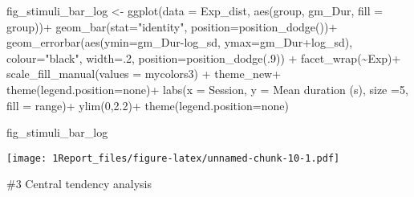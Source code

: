 \documentclass[
]{article}
\newenvironment{Shaded}{\begin{snugshade}}{\end{snugshade}}
\newcommand{\AttributeTok}[1]{\textcolor[rgb]{0.77,0.63,0.00}{#1}}
\newcommand{\DecValTok}[1]{\textcolor[rgb]{0.00,0.00,0.81}{#1}}
\newcommand{\FloatTok}[1]{\textcolor[rgb]{0.00,0.00,0.81}{#1}}
\newcommand{\FunctionTok}[1]{\textcolor[rgb]{0.00,0.00,0.00}{#1}}
\newcommand{\NormalTok}[1]{#1}
\newcommand{\OtherTok}[1]{\textcolor[rgb]{0.56,0.35,0.01}{#1}}
\newcommand{\SpecialCharTok}[1]{\textcolor[rgb]{0.00,0.00,0.00}{#1}}
\newcommand{\StringTok}[1]{\textcolor[rgb]{0.31,0.60,0.02}{#1}}
\begin{document}
\begin{Shaded}
\begin{Highlighting}[]
\NormalTok{fig\_stimuli\_bar\_log }\OtherTok{\textless{}{-}} \FunctionTok{ggplot}\NormalTok{(}\AttributeTok{data =}\NormalTok{ Exp\_dist, }\FunctionTok{aes}\NormalTok{(group, gm\_Dur, }\AttributeTok{fill =}\NormalTok{ group))}\SpecialCharTok{+}
  \FunctionTok{geom\_bar}\NormalTok{(}\AttributeTok{stat=}\StringTok{"identity"}\NormalTok{, }\AttributeTok{position=}\FunctionTok{position\_dodge}\NormalTok{())}\SpecialCharTok{+}
  \FunctionTok{geom\_errorbar}\NormalTok{(}\FunctionTok{aes}\NormalTok{(}\AttributeTok{ymin=}\NormalTok{gm\_Dur}\SpecialCharTok{{-}}\NormalTok{log\_sd, }\AttributeTok{ymax=}\NormalTok{gm\_Dur}\SpecialCharTok{+}\NormalTok{log\_sd), }\AttributeTok{colour=}\StringTok{"black"}\NormalTok{, }\AttributeTok{width=}\NormalTok{.}\DecValTok{2}\NormalTok{, }\AttributeTok{position=}\FunctionTok{position\_dodge}\NormalTok{(.}\DecValTok{9}\NormalTok{)) }\SpecialCharTok{+} 
  \FunctionTok{facet\_wrap}\NormalTok{(}\SpecialCharTok{\textasciitilde{}}\NormalTok{Exp)}\SpecialCharTok{+}
  \FunctionTok{scale\_fill\_manual}\NormalTok{(}\AttributeTok{values =}\NormalTok{ mycolors3) }\SpecialCharTok{+}
\NormalTok{  theme\_new}\SpecialCharTok{+} \FunctionTok{theme}\NormalTok{(}\AttributeTok{legend.position=}\StringTok{\textquotesingle{}none\textquotesingle{}}\NormalTok{)}\SpecialCharTok{+}
  \FunctionTok{labs}\NormalTok{(}\AttributeTok{x =} \StringTok{\textquotesingle{}Session\textquotesingle{}}\NormalTok{, }\AttributeTok{y =} \StringTok{\textquotesingle{}Mean duration (s)\textquotesingle{}}\NormalTok{, }\AttributeTok{size =}\DecValTok{5}\NormalTok{,  }\AttributeTok{fill =} \StringTok{\textquotesingle{}range\textquotesingle{}}\NormalTok{)}\SpecialCharTok{+}
  \FunctionTok{ylim}\NormalTok{(}\DecValTok{0}\NormalTok{,}\FloatTok{2.2}\NormalTok{)}\SpecialCharTok{+} \FunctionTok{theme}\NormalTok{(}\AttributeTok{legend.position=}\StringTok{\textquotesingle{}none\textquotesingle{}}\NormalTok{)}

\NormalTok{fig\_stimuli\_bar\_log}
\end{Highlighting}
\end{Shaded}

\texttt{[image: 1Report\_files/figure-latex/unnamed-chunk-10-1.pdf]}

\#3 Central tendency analysis
\end{document}
